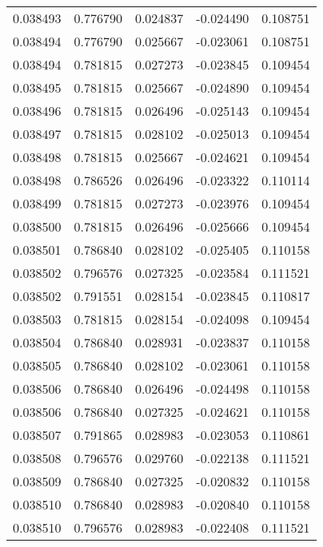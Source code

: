 \begin{tabular}{lrrrr}
0.038493    &  0.776790 &  0.024837 & -0.024490 &             0.108751 \\
0.038494    &  0.776790 &  0.025667 & -0.023061 &             0.108751 \\
0.038494    &  0.781815 &  0.027273 & -0.023845 &             0.109454 \\
0.038495    &  0.781815 &  0.025667 & -0.024890 &             0.109454 \\
0.038496    &  0.781815 &  0.026496 & -0.025143 &             0.109454 \\
0.038497    &  0.781815 &  0.028102 & -0.025013 &             0.109454 \\
0.038498    &  0.781815 &  0.025667 & -0.024621 &             0.109454 \\
0.038498    &  0.786526 &  0.026496 & -0.023322 &             0.110114 \\
0.038499    &  0.781815 &  0.027273 & -0.023976 &             0.109454 \\
0.038500    &  0.781815 &  0.026496 & -0.025666 &             0.109454 \\
0.038501    &  0.786840 &  0.028102 & -0.025405 &             0.110158 \\
0.038502    &  0.796576 &  0.027325 & -0.023584 &             0.111521 \\
0.038502    &  0.791551 &  0.028154 & -0.023845 &             0.110817 \\
0.038503    &  0.781815 &  0.028154 & -0.024098 &             0.109454 \\
0.038504    &  0.786840 &  0.028931 & -0.023837 &             0.110158 \\
0.038505    &  0.786840 &  0.028102 & -0.023061 &             0.110158 \\
0.038506    &  0.786840 &  0.026496 & -0.024498 &             0.110158 \\
0.038506    &  0.786840 &  0.027325 & -0.024621 &             0.110158 \\
0.038507    &  0.791865 &  0.028983 & -0.023053 &             0.110861 \\
0.038508    &  0.796576 &  0.029760 & -0.022138 &             0.111521 \\
0.038509    &  0.786840 &  0.027325 & -0.020832 &             0.110158 \\
0.038510    &  0.786840 &  0.028983 & -0.020840 &             0.110158 \\
0.038510    &  0.796576 &  0.028983 & -0.022408 &             0.111521 \\

\end{tabular}
